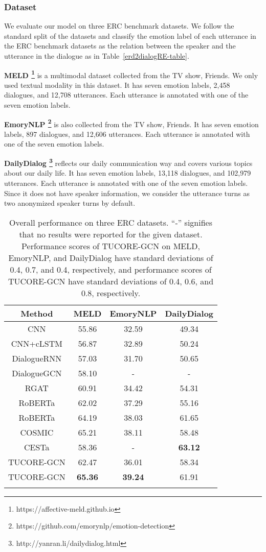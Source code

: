 \documentclass[11pt]{article}
\begin{document}
\subsubsection{Dataset}
We evaluate our model on three ERC benchmark datasets. We follow the standard split of the datasets and classify the emotion label of each utterance in the ERC benchmark datasets as the relation between the speaker and the utterance in the dialogue as in Table~\ref{erd2dialogRE-table}. 

\textbf{MELD \citep{poria-etal-2019-meld}\footnote{https://affective-meld.github.io}} is a multimodal dataset collected from the TV show, Friends. We only used textual modality in this dataset. It has seven emotion labels, 2,458 dialogues, and 12,708 utterances. Each utterance is annotated with one of the seven emotion labels. 

\textbf{EmoryNLP \citep{DBLP:conf/aaai/ZahiriC18}\footnote{https://github.com/emorynlp/emotion-detection}} is also collected from the TV show, Friends. It has seven emotion labels, 897 dialogues, and 12,606 utterances. Each utterance is annotated with one of the seven emotion labels. 

\textbf{DailyDialog \citep{li-etal-2017-dailydialog}\footnote{http://yanran.li/dailydialog.html}} reflects our daily communication way and covers various topics about our daily life. It has seven emotion labels, 13,118 dialogues, and 102,979 utterances. Each utterance is annotated with one of the seven emotion labels. Since it does not have speaker information, we consider the utterance turns as two anonymized speaker turns by default.

\begin{table*}
\centering
{\small
\begin{tabular}{c|ccc}
\Xhline{3\arrayrulewidth}
\textbf{Method} & \textbf{MELD} & \textbf{EmoryNLP} & \textbf{DailyDialog}\\
\hline
CNN & 55.86 & 32.59 & 49.34 \\ 
CNN+cLSTM & 56.87 & 32.89 & 50.24 \\ 
DialogueRNN & 57.03 & 31.70 & 50.65 \\ 
DialogueGCN & 58.10 & - & - \\ 
RGAT & 60.91 & 34.42 & 54.31 \\
RoBERTa & 62.02 & 37.29 & 55.16 \\
RoBERTa & 64.19 & 38.03 & 61.65 \\
COSMIC & 65.21 & 38.11 & 58.48 \\
CESTa & 58.36 & - & \textbf{63.12} \\
\hline
TUCORE-GCN & 62.47 & 36.01 & 58.34 \\
TUCORE-GCN & \textbf{65.36} & \textbf{39.24} & 61.91 \\
\Xhline{3\arrayrulewidth}
\end{tabular}
}
\caption{\label{ERC-result} Overall performance on three ERC datasets. “-” signifies that no results were reported for the given dataset. Performance scores of TUCORE-GCN on MELD, EmoryNLP, and DailyDialog have standard deviations of 0.4, 0.7, and 0.4, respectively, and performance scores of TUCORE-GCN have standard deviations of 0.4, 0.6, and 0.8, respectively.}
\end{table*}
\end{document}
